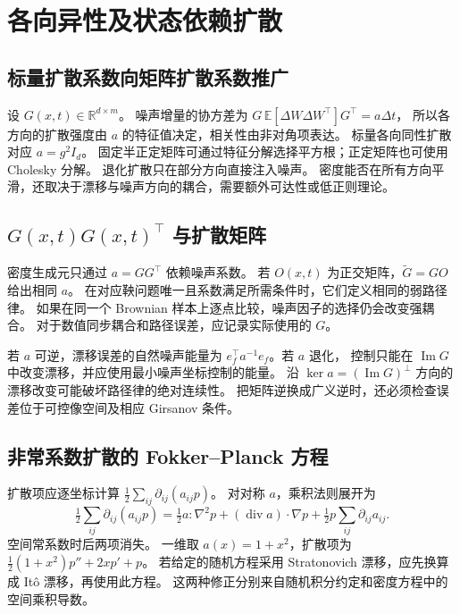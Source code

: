 \section{各向异性及状态依赖扩散}
\label{sec:unified-anisotropic}

\subsection{标量扩散系数向矩阵扩散系数推广}

设 \(G(x,t)\in\mathbb R^{d\times m}\)。
噪声增量的协方差为 \(G\,\mathbb E[\Delta W\Delta W^\top]G^\top=a\Delta t\)，
所以各方向的扩散强度由 \(a\) 的特征值决定，相关性由非对角项表达。
标量各向同性扩散对应 \(a=g^2I_d\)。
固定半正定矩阵可通过特征分解选择平方根；正定矩阵也可使用 Cholesky 分解。
退化扩散只在部分方向直接注入噪声。
密度能否在所有方向平滑，还取决于漂移与噪声方向的耦合，需要额外可达性或低正则理论。

\subsection{\texorpdfstring{\(G(x,t)G(x,t)^\top\)}{G(x,t)G(x,t)ᵀ} 与扩散矩阵}

密度生成元只通过 \(a=GG^\top\) 依赖噪声系数。
若 \(O(x,t)\) 为正交矩阵，\(\widetilde G=GO\) 给出相同 \(a\)。
在对应鞅问题唯一且系数满足所需条件时，它们定义相同的弱路径律。
如果在同一个 Brownian 样本上逐点比较，噪声因子的选择仍会改变强耦合。
对于数值同步耦合和路径误差，应记录实际使用的 \(G\)。

若 \(a\) 可逆，漂移误差的自然噪声能量为
\(e_f^\top a^{-1}e_f\)。若 \(a\) 退化，
控制只能在 \(\operatorname{Im}G\) 中改变漂移，并应使用最小噪声坐标控制的能量。
沿 \(\ker a=(\operatorname{Im}G)^\perp\) 方向的漂移改变可能破坏路径律的绝对连续性。
把矩阵逆换成广义逆时，还必须检查误差位于可控像空间及相应 Girsanov 条件。

\subsection{非常系数扩散的 Fokker--Planck 方程}

扩散项应逐坐标计算 \(\frac12\sum_{ij}\partial_{ij}(a_{ij}p)\)。
对对称 \(a\)，乘积法则展开为
\begin{equation}
 \tfrac12\sum_{ij}\partial_{ij}(a_{ij}p)
 =\tfrac12 a:\nabla^2p+(\operatorname{div}a)\cdot\nabla p
                      +\tfrac12p\sum_{ij}\partial_{ij}a_{ij}.
 \label{eq:unified-variable-diffusion}
\end{equation}
空间常系数时后两项消失。
一维取 \(a(x)=1+x^2\)，扩散项为
\(\frac12(1+x^2)p''+2xp'+p\)。
若给定的随机方程采用 Stratonovich 漂移，应先换算成 It\^o 漂移，再使用此方程。
这两种修正分别来自随机积分约定和密度方程中的空间乘积导数。

